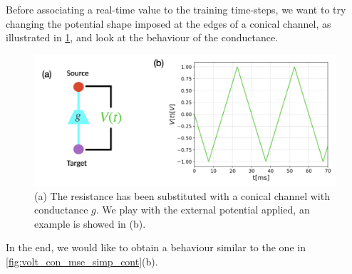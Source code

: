 \documentclass[10.5pt]{article}
\begin{document}
Before associating a real-time value to the training time-steps, we want to try changing the potential shape imposed at the edges of a conical channel, as illustrated in \cref{fig:cone_voltage}, and look at the behaviour of the conductance. 
\begin{figure}[h]
    \centering
    \includegraphics[width=0.6\columnwidth]{../figures_tex/cone_voltage.png}
    \caption{(a) The resistance has been substituted with a conical channel with conductance $g$. We play with the external potential applied, an example is showed in (b). }
    \label{fig:cone_voltage}
\end{figure}
In the end, we would like to obtain a behaviour similar to the one in \cref{fig:volt_con_mse_simp_cont}(b). 
\end{document}

